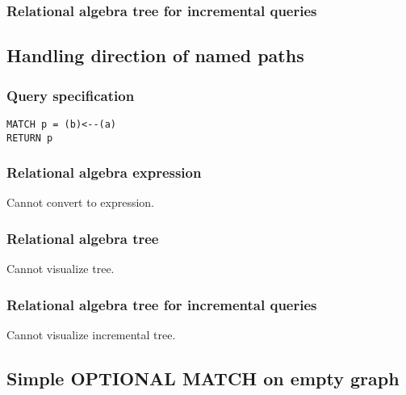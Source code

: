 \subsubsection*{Relational algebra tree for incremental queries}


\subsection{Handling direction of named paths}

\subsubsection*{Query specification}

\begin{lstlisting}
MATCH p = (b)<--(a)
RETURN p
\end{lstlisting}

\subsubsection*{Relational algebra expression}

Cannot convert to expression.

\subsubsection*{Relational algebra tree}

Cannot visualize tree.

\subsubsection*{Relational algebra tree for incremental queries}

Cannot visualize incremental tree.

\subsection{Simple OPTIONAL MATCH on empty graph}

